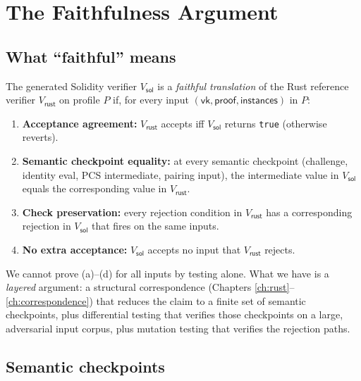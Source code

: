 \chapter{The Faithfulness Argument}
\label{ch:faithfulness}

\section{What ``faithful'' means}
\label{sec:faithful-meaning}

\begin{definition}
\label{def:faithful}
The generated Solidity verifier $V_{\mathsf{sol}}$ is a \emph{faithful
translation} of the Rust reference verifier $V_{\mathsf{rust}}$ on profile
$P$ if, for every input $(\mathsf{vk}, \mathsf{proof}, \mathsf{instances})$
in $P$:
\begin{enumerate}[label=(\alph*)]
  \item \textbf{Acceptance agreement:} $V_{\mathsf{rust}}$ accepts iff
        $V_{\mathsf{sol}}$ returns \texttt{true} (otherwise reverts).
  \item \textbf{Semantic checkpoint equality:} at every semantic checkpoint
        (challenge, identity eval, PCS intermediate, pairing input), the
        intermediate value in $V_{\mathsf{sol}}$ equals the corresponding
        value in $V_{\mathsf{rust}}$.
  \item \textbf{Check preservation:} every rejection condition in
        $V_{\mathsf{rust}}$ has a corresponding rejection in
        $V_{\mathsf{sol}}$ that fires on the same inputs.
  \item \textbf{No extra acceptance:} $V_{\mathsf{sol}}$ accepts no input
        that $V_{\mathsf{rust}}$ rejects.
\end{enumerate}
\end{definition}

We cannot prove (a)--(d) for all inputs by testing alone. What we have is a
\emph{layered} argument: a structural correspondence (Chapters
\ref{ch:rust}--\ref{ch:correspondence}) that reduces the claim to a finite
set of semantic checkpoints, plus differential testing that verifies those
checkpoints on a large, adversarial input corpus, plus mutation testing
that verifies the rejection paths.

\section{Semantic checkpoints}
\label{sec:checkpoints}


